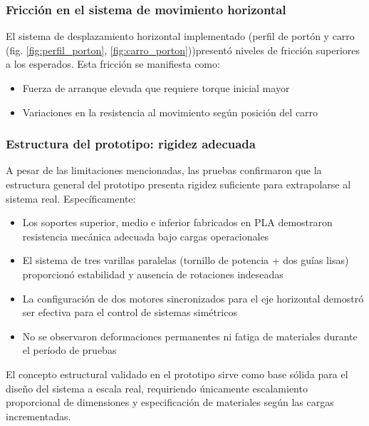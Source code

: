 \subsubsection{Fricción en el sistema de movimiento horizontal}

El sistema de desplazamiento horizontal implementado (perfil de portón y carro (fig. \ref{fig:perfil_porton}, \ref{fig:carro_porton}))presentó niveles de fricción superiores a los esperados. Esta fricción se manifiesta como:

\begin{itemize}
    \item Fuerza de arranque elevada que requiere torque inicial mayor
    \item Variaciones en la resistencia al movimiento según posición del carro
\end{itemize}

\subsubsection{Estructura del prototipo: rigidez adecuada}

A pesar de las limitaciones mencionadas, las pruebas confirmaron que la estructura general del prototipo presenta rigidez suficiente para extrapolarse al sistema real. Específicamente:

\begin{itemize}
    \item Los soportes superior, medio e inferior fabricados en PLA demostraron resistencia mecánica adecuada bajo cargas operacionales
    \item El sistema de tres varillas paralelas (tornillo de potencia + dos guías lisas) proporcionó estabilidad y ausencia de rotaciones indeseadas
    \item La configuración de dos motores sincronizados para el eje horizontal demostró ser efectiva para el control de sistemas simétricos
    \item No se observaron deformaciones permanentes ni fatiga de materiales durante el período de pruebas
\end{itemize}

El concepto estructural validado en el prototipo sirve como base sólida para el diseño del sistema a escala real, requiriendo únicamente escalamiento proporcional de dimensiones y especificación de materiales según las cargas incrementadas.


